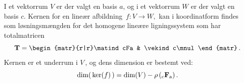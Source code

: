\begin{method}\label{tn8.metodeKerne}
I et vektorrum $V$ er der valgt en basis $a$, og i et vektorrum $ W $ er der valgt en basis $c$. Kernen for en lineær afbildning $\,f:V\rightarrow W,$ kan i koordinatform findes som løsningsmængden for det homogene lineære ligningssystem som har totalmatricen
$$\mT=
\begin{matr}{r|r}\matind cFa & \vekind c\mnul \end{matr}\,.$$
Kernen er et underrum i $V\,$, og dens dimension er bestemt ved:
\begin{equation}\label{tn8.methodKernen}
\mathrm{dim}(\,\ker(f)\,)=\mathrm{dim}(V)-\rho\,({_\mathrm{c}\mathbf{F}_\mathrm{a}})\,.
\end{equation}
\end{method}

